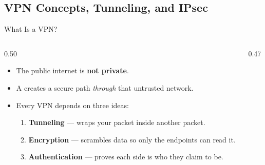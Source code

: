 \documentclass[aspectratio=169]{beamer}  %
\begin{document}
\subsection{VPN Concepts, Tunneling, and IPsec}


\begin{frame}[t]{What Is a VPN?}
    \begin{columns}[T]
        \begin{column}{0.50\textwidth}
            \begin{itemize}
                \item The public internet is \textbf{not private}.
                \item A  creates a secure path \textit{through} that untrusted network.
                \item Every VPN depends on three ideas:
                    \begin{enumerate}
                        \footnotesize
                        \item \textbf{Tunneling} --- wraps your packet inside another packet.
                        \item \textbf{Encryption} --- scrambles data so only the endpoints can read it.
                        \item \textbf{Authentication} --- proves each side is who they claim to be.
                    \end{enumerate}
            \end{itemize}
        \end{column}
        \begin{column}{0.47\textwidth}
            \begin{center}
\end{center}
\end{column}
\end{columns}
\end{frame}
\end{document}
